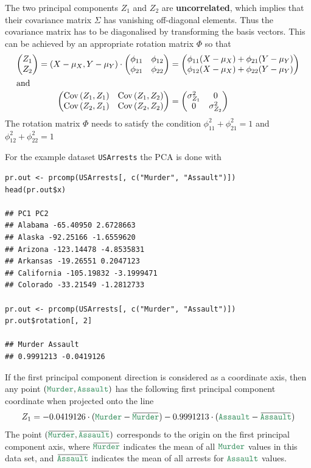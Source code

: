 \documentclass[11pt]{article}
\newcommand*\Z{\mathbb{Z}}
\newcommand*\Cov[1]{\mathop{\text{Cov}}\left(#1\right)}
\newcommand*\predvar[1]{{\color{SeaGreen4} \texttt{#1}}}
\newcommand{\overbar}[1]{\mkern 1.5mu\overline{\mkern-1.5mu#1\mkern-1.5mu}\mkern 1.5mu}
\begin{document}
The two principal components $Z_1$ and $Z_2$ are \textbf{uncorrelated}, which implies that their covariance matrix $\Sigma$ has vanishing off-diagonal elements. Thus the covariance matrix has to be diagonalised by transforming the basis vectors. This can be achieved by an appropriate rotation matrix $\Phi$ so that
\begin{align*}
\begin{pmatrix} Z_1\\Z_2 \end{pmatrix} = (X-\mu_X, Y-\mu_Y) \cdot \begin{pmatrix}\phi_{11}&\phi_{12}\\\phi_{21}&\phi_{22}\end{pmatrix} &= \begin{pmatrix}
\phi_{11}(X-\mu_X) + \phi_{21}(Y-\mu_Y)\\
\phi_{12}(X-\mu_X) + \phi_{22}(Y-\mu_Y)
\end{pmatrix}\\
\intertext{and}
\begin{pmatrix} \Cov{Z_1,Z_1} & \Cov{Z_1,Z_2}\\ \Cov{Z_2,Z_1} & \Cov{Z_2,Z_2} \end{pmatrix} &= \begin{pmatrix} \sigma_{Z_1}^2 & 0 \\ 0 & \sigma_{Z_2}^2 \end{pmatrix}
\end{align*}
The rotation matrix $\Phi$ needs to satisfy the condition $\phi_{11}^2 + \phi_{21}^2 = 1$ and $\phi_{12}^2 + \phi_{22}^2 = 1$

\vspace{1em}
\noindent
For the example dataset \predvar{USArrests} the PCA is done with
\begin{verbatim}
pr.out <- prcomp(USArrests[, c("Murder", "Assault")])
head(pr.out$x)

## PC1 PC2
## Alabama -65.40950 2.6728663
## Alaska -92.25166 -1.6559620
## Arizona -123.14478 -4.8535831
## Arkansas -19.26551 0.2047123
## California -105.19832 -3.1999471
## Colorado -33.21549 -1.2812733

pr.out <- prcomp(USArrests[, c("Murder", "Assault")])
pr.out$rotation[, 2]

## Murder Assault
## 0.9991213 -0.0419126
\end{verbatim}
If the first principal component direction is considered as a coordinate axis, then any point $(\predvar{Murder},\predvar{Assault})$ has the following first principal component coordinate when projected onto the line
\begin{equation*}
Z_1 = -0.0419126\cdot(\text{\predvar{Murder}} - \overbar{\text{\predvar{Murder}}}) - 0.9991213\cdot(\text{\predvar{Assault}} - \overbar{\text{\predvar{Assault}}})
\end{equation*}
The point $(\overbar{\text{\predvar{Murder}}},\overbar{\text{\predvar{Assault}}})$ corresponds to the origin on the first principal component axis, where $\overbar{\text{\predvar{Murder}}}$ indicates the mean of all $\predvar{Murder}$ values in this data set, and $\overbar{\text{\predvar{Assault}}}$ indicates the mean of all arrests for $\predvar{Assault}$ values.
\end{document}
